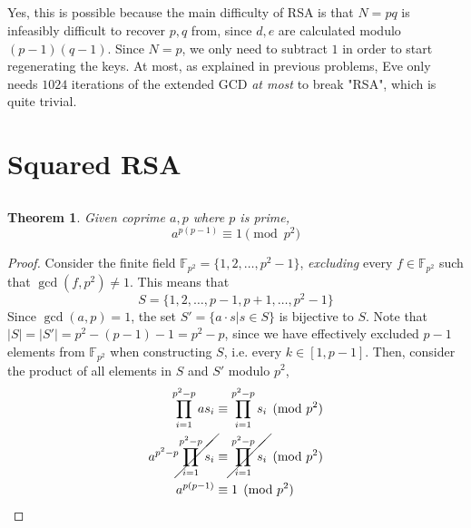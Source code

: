 \documentclass{article}
\newtheorem{theorem}{Theorem}
\begin{document}
\subsection{}

Yes, this is possible because the main difficulty of RSA is that \(N = pq\) is infeasibly difficult to recover \(p, q\) from, since \(d, e\) are calculated modulo \((p - 1) (q - 1)\).
Since \(N = p\), we only need to subtract \(1\) in order to start regenerating the keys.
At most, as explained in previous problems, Eve only needs \(1024\) iterations of the extended GCD \emph{at most} to break "RSA", which is quite trivial.

\section{Squared RSA}

\subsection{}

\begin{theorem} \label{thm:2a}
    Given coprime \(a, p\) where \(p\) is prime,
    \begin{equation}
        a^{p (p - 1)} \equiv 1 \pmod{p^2}
    \end{equation}
\end{theorem}
\begin{proof}
    Consider the finite field \(\mathbb{F}_{p^2} = \{1, 2, \ldots, p^2 - 1\}\), \emph{excluding} every \(f \in \mathbb{F}_{p^2}\) such that \(\gcd(f, p^2) \neq 1\).
    This means that
    \begin{equation}
        S = \{1, 2, \ldots, p - 1, p + 1, \ldots, p^2 - 1\}
    \end{equation}
    Since \(\gcd(a, p) = 1\), the set \(S' = \{a \cdot s | s \in S\}\) is bijective to \(S\).
    Note that \(|S| = |S'| = p^2 - (p - 1) - 1 = p^2 - p\), since we have effectively excluded \(p - 1\) elements from \(\mathbb{F}_{p^2}\) when constructing \(S\), i.e. every \(k \in [1, p - 1]\).
    Then, consider the product of all elements in \(S\) and \(S'\) modulo \(p^2\),
    \begin{align}
        \prod_{i = 1}^{p^2 - p} a s_i &\equiv \prod_{i = 1}^{p^2 - p} s_i \pmod{p^2} \\
        a^{p^2 - p} \cancel{\prod_{i = 1}^{p^2 - p} s_i} &\equiv \cancel{\prod_{i = 1}^{p^2 - p} s_i} \pmod{p^2} \\
        a^{p (p - 1)} &\equiv 1 \pmod{p^2}
    \end{align}
\end{proof}
\end{document}
